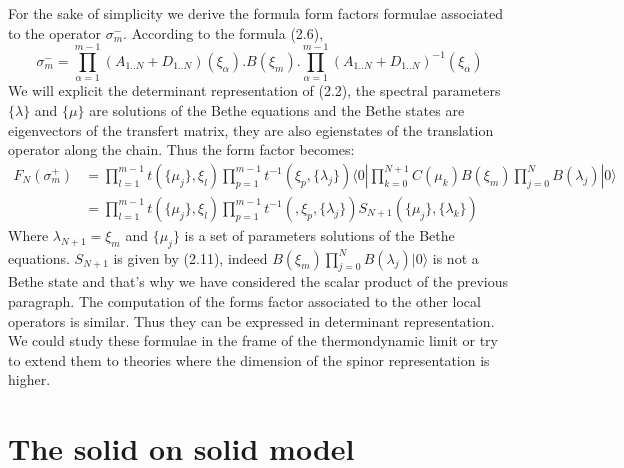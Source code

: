 \documentclass[12pt]{article}
\begin{document}
For the sake of simplicity we derive the formula form factors formulae associated to the operator $\sigma_{m}^{-} $.
According to the formula (2.6), 
\begin{equation}
\sigma_{m}^{-}=\prod_{\alpha=1}^{m-1}(A_{1..N}+D_{1..N})(\xi_{\alpha}) . B(\xi_{m}) . \prod_{\alpha=1}^{m-1}(A_{1..N}+D_{1..N})^{-1}(\xi_{\alpha})
\end{equation}
 We will explicit the determinant representation of (2.2), the spectral parameters  $\{\lambda\}$ and  $\{\mu\}$ are solutions of the Bethe equations and the Bethe states are eigenvectors of the transfert matrix, they are also egienstates of the translation operator along the chain. Thus the form factor becomes: 
\begin{align}
F_{N}(\sigma_{m}^{+})&=\prod_{l=1}^{m-1}t(\{\mu_j\},\xi_l)\prod_{p=1}^{m-1}t^{-1}(\xi_p,\{\lambda_j\})\langle 0|\prod_{k=0}^{N+1}C(\mu_{k})B(\xi_m)\prod_{j=0}^{N}B(\lambda_{j})|0\rangle\\
&=\prod_{l=1}^{m-1}t(\{\mu_j\},\xi_l)\prod_{p=1}^{m-1}t^{-1}(,\xi_p,\{\lambda_j\})S_{N+1}(\{\mu_{j}\},\{\lambda_{k}\})
\end{align}
Where $\lambda_{N+1}=\xi_m $ and $\{\mu_{j}\}$ is a set of parameters solutions of the Bethe equations. $S_{N+1}$ is given by (2.11), indeed $B(\xi_m)\prod_{j=0}^{N}B(\lambda_{j})|0\rangle$ is not a Bethe state and that's why we have considered the scalar product of the previous paragraph. The computation of the forms factor associated to the other local operators is similar\cite{MaiT00}. Thus they can be expressed in determinant representation. We could study these formulae in the frame of the thermondynamic limit\cite{Yan52} or try to extend them to theories where the dimension of the spinor representation is higher.


\section{The solid on solid model}
\end{document}
